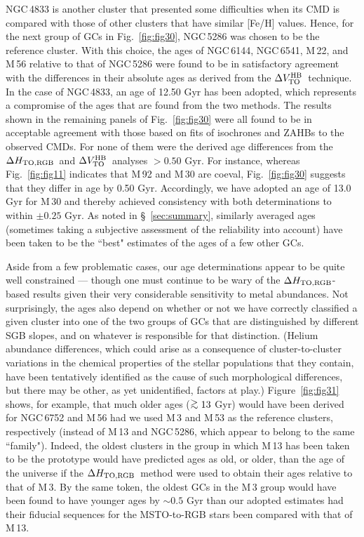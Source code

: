 \documentclass[12pt,preprint]{aastex}
\newcommand\delv{\Delta V^{\rm HB}_{\rm TO}}
\newcommand\delc{\Delta H_{\rm TO,RGB}}
\newcommand\gta{\mathrel{\hbox{\raise 0.6 ex \hbox{$>$}\kern
                   -1.7 ex\lower .5 ex\hbox{$\sim$}}}}
\begin{document}
NGC$\,$4833 is another cluster that presented some difficulties when its CMD
is compared with those of other clusters that have similar [Fe/H] values.
Hence, for the next group of GCs in Fig.~\ref{fig:fig30}, NGC$\,$5286 was chosen
to be the reference cluster.  With this choice, the ages of NGC$\,$6144,
NGC$\,$6541, M$\,$22, and M$\,$56 relative to that of NGC$\,$5286 were
found to be in satisfactory agreement with the differences in their absolute
ages as derived from the $\delv$\ technique.  In the case of NGC$\,$4833, an age
of 12.50 Gyr has been adopted, which represents a compromise of the ages that
are found from the two methods.  The results shown in the remaining panels of
Fig.~\ref{fig:fig30} were all found to be in acceptable agreement with those
based on fits of isochrones and ZAHBs to the observed CMDs.  For none of them
were the derived age differences from the $\delc$\ and $\delv$\ analyses
$> 0.50$ Gyr.  For instance, whereas Fig.~\ref{fig:fig11} indicates that M$\,$92
and M$\,$30 are coeval, Fig.~\ref{fig:fig30} suggests that they differ in age by
0.50 Gyr.  Accordingly, we have adopted an age of 13.0 Gyr for M$\,$30 and
thereby achieved consistency with both determinations to within $\pm 0.25$ Gyr.
As noted in \S~\ref{sec:summary}, similarly averaged ages (sometimes taking a
subjective assessment of the reliability into account) have been taken to
be the ``best" estimates of the ages of a few other GCs.

Aside from a few problematic cases, our age determinations appear to be quite
well constrained --- though one must continue to be wary of the $\delc$-based
results given their very considerable sensitivity to metal abundances.  Not
surprisingly, the ages also depend on whether or not we have correctly
classified a given cluster into one of the two groups of GCs that are
distinguished by different SGB slopes, and on whatever is responsible for that
distinction.  (Helium abundance differences, which could arise as a consequence
of cluster-to-cluster variations in the chemical properties of the stellar
populations that they contain, have been tentatively identified as the cause of
such morphological differences, but there may be other, as yet unidentified,
factors at play.)  Figure~\ref{fig:fig31} shows, for example, that much older
ages ($\gta 13$ Gyr) would have been derived for NGC$\,$6752 and M$\,$56 had
we used M$\,$3 and M$\,$53 as the reference clusters, respectively (instead
of M$\,$13 and NGC$\,$5286, which appear to belong to the same ``family").
Indeed, the oldest clusters in the group in which M$\,$13 has been taken to be
the prototype would have predicted ages as old, or older, than the age of the
universe if the $\delc$\ method were used to obtain their ages relative to
that of M$\,$3.  By the same token, the oldest GCs in the M$\,$3 group would
have been found to have younger ages by $\sim 0.5$ Gyr than our adopted
estimates had their fiducial sequences for the MSTO-to-RGB stars been compared
with that of M$\,$13. 
\end{document}
